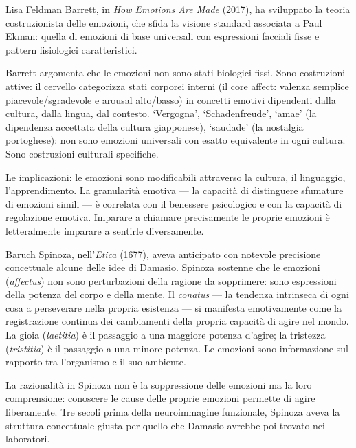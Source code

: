 \documentclass[12pt,a4paper,openany]{book}
\newcommand{\sezione}[1]{\vspace{1.2em}{\large\bfseries #1}\vspace{0.5em}\par}
\begin{document}
Lisa Feldman Barrett, in \textit{How Emotions Are Made} (2017), ha sviluppato la teoria costruzionista delle emozioni, che sfida la visione standard associata a Paul Ekman: quella di emozioni di base universali con espressioni facciali fisse e pattern fisiologici caratteristici.

Barrett argomenta che le emozioni non sono stati biologici fissi. Sono costruzioni attive: il cervello categorizza stati corporei interni (il core affect: valenza semplice piacevole/sgradevole e arousal alto/basso) in concetti emotivi dipendenti dalla cultura, dalla lingua, dal contesto. `Vergogna', `Schadenfreude', `amae' (la dipendenza accettata della cultura giapponese), `saudade' (la nostalgia portoghese): non sono emozioni universali con esatto equivalente in ogni cultura. Sono costruzioni culturali specifiche.

Le implicazioni: le emozioni sono modificabili attraverso la cultura, il linguaggio, l'apprendimento. La granularità emotiva — la capacità di distinguere sfumature di emozioni simili — è correlata con il benessere psicologico e con la capacità di regolazione emotiva. Imparare a chiamare precisamente le proprie emozioni è letteralmente imparare a sentirle diversamente.

\sezione{Baruch Spinoza: un precursore sorprendente}

Baruch Spinoza, nell'\textit{Etica} (1677), aveva anticipato con notevole precisione concettuale alcune delle idee di Damasio. Spinoza sostenne che le emozioni (\textit{affectus}) non sono perturbazioni della ragione da sopprimere: sono espressioni della potenza del corpo e della mente. Il \textit{conatus} — la tendenza intrinseca di ogni cosa a perseverare nella propria esistenza — si manifesta emotivamente come la registrazione continua dei cambiamenti della propria capacità di agire nel mondo. La gioia (\textit{laetitia}) è il passaggio a una maggiore potenza d'agire; la tristezza (\textit{tristitia}) è il passaggio a una minore potenza. Le emozioni sono informazione sul rapporto tra l'organismo e il suo ambiente.

La razionalità in Spinoza non è la soppressione delle emozioni ma la loro comprensione: conoscere le cause delle proprie emozioni permette di agire liberamente. Tre secoli prima della neuroimmagine funzionale, Spinoza aveva la struttura concettuale giusta per quello che Damasio avrebbe poi trovato nei laboratori.

\sezione{La regolazione emotiva come competenza}
\end{document}
